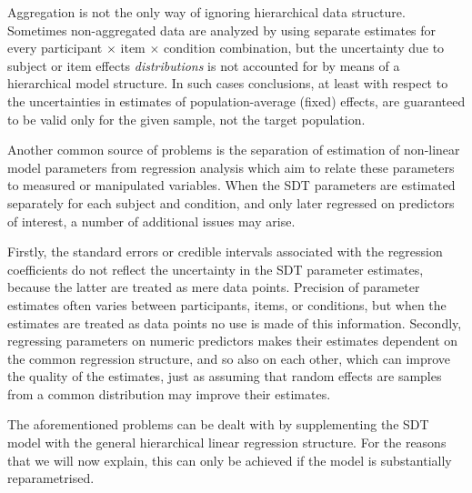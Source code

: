 \documentclass[oneside,a4paper]{article}
\begin{document}
Aggregation is not the only way of ignoring hierarchical data
structure. Sometimes non-aggregated data are analyzed by using
separate estimates for every participant $\times$ item $\times$
condition combination, but the uncertainty due to subject or item
effects \emph{distributions} is not accounted for by means of a
hierarchical model
structure. In such cases conclusions, at least with respect to
%
the uncertainties in estimates of population-average (fixed)
effects, are guaranteed to be valid only for the given sample, not the
target population.

Another common source of problems is the separation of estimation of
non-linear model parameters from regression analysis which aim to
relate these parameters to measured or manipulated variables. When the
SDT parameters are estimated separately for each subject and
condition, and only later regressed on predictors of interest, a
number of additional issues may arise.

Firstly, the standard errors or credible intervals associated with the
regression coefficients do not reflect the uncertainty in the SDT
parameter estimates, because the latter are treated as mere data
points. Precision of parameter estimates often varies between
participants, items, or conditions, but when the estimates are treated
as data points no use is made of this information. Secondly,
regressing parameters on numeric predictors makes their estimates
dependent on the common regression structure, and so also on each
other, which can improve the quality of the estimates, just as
assuming that random effects are samples from a common distribution
may improve their estimates.

The aforementioned problems can be dealt with by supplementing the SDT
model with the general hierarchical linear regression structure. For
the reasons that we will now explain, this can only be achieved if the
model is substantially reparametrised.
\end{document}
